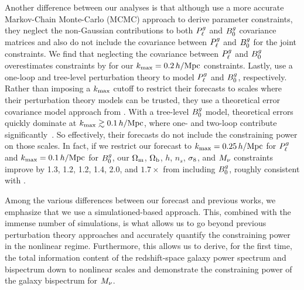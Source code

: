 Another difference between our analyses is that although \cite{chudaykin2019} use 
a more accurate Markov-Chain Monte-Carlo (MCMC) approach to derive parameter
constraints, they neglect the non-Gaussian contributions to both $P^g_{\ell}$ and
$B^g_0$ covariance matrices and also do not include the covariance between $P^g_{\ell}$
and $B^g_0$ for the joint constraints. We find that neglecting the covariance
between $P^g_{\ell}$ and $B^g_0$ overestimates constraints by  for our
$k_{\rm max}=0.2\,h/\mathrm{Mpc}$ constraints. Lastly, \cite{chudaykin2019} use a one-loop 
and tree-level perturbation theory to model $P^g_{\ell}$ and $B^g_0$, respectively.
Rather than imposing a $k_{\rm max}$ cutoff to restrict their forecasts to scales
where their perturbation theory models can be trusted, they use a theoretical
error covariance model approach from \cite{baldauf2016}. With a tree-level
$B^g_0$ model, theoretical errors quickly dominate at $k_{\rm max} \gtrsim 0.1\,h/\mathrm{Mpc}$,
where one- and two-loop contribute significantly~\citep[\eg][]{lazanu2018}. 
So effectively, their forecasts do not include the constraining power on
those scales. In fact, if we restrict our forecast to $k_{\rm max} = 0.25\,h/\mathrm{Mpc}$ 
for $P^g_{\ell}$ and $k_{\rm max} = 0.1\,h/\mathrm{Mpc}$ for $B^g_0$, our $\Omega_{\rm m}$, $\Omega_{\rm b}$, $h$, $n_s$, 
$\sigma_8$, and $M_\nu$ constraints improve by 1.3, 1.2, 1.2, 1.4, 2.0, and 
$1.7\times$ from including $B^g_0$, roughly consistent with \cite{chudaykin2019}. 


Among the various differences between our forecast and previous works, we
emphasize that we use a simulationed-based approach. This, combined with the 
immense number of simulations, is what allows us to go beyond previous
perturbation theory approaches and accurately quantify the constraining power
in the nonlinear regime. Furthermore, this allows us to derive, for the first
time, the total information content of the redshift-space galaxy power spectrum
and bispectrum down to nonlinear scales and demonstrate the constraining power
of the galaxy bispectrum for $M_\nu$. 


